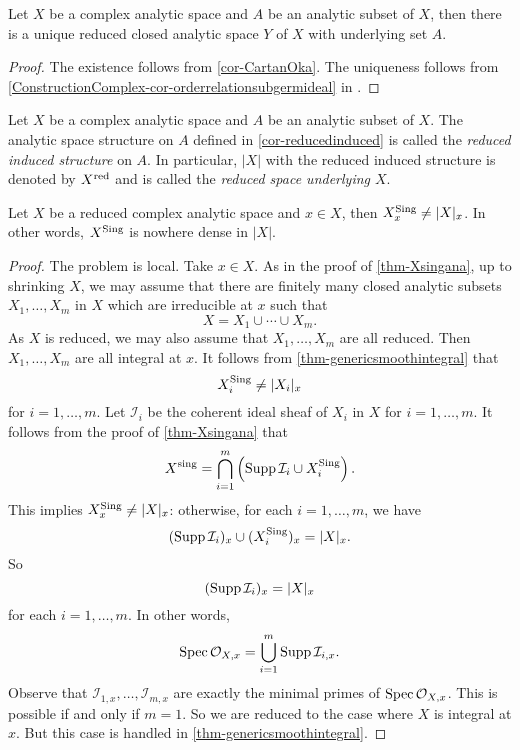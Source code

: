 \begin{corollary}\label{cor-reducedinduced}
    Let $X$ be a complex analytic space and $A$ be an analytic subset of $X$, then there is a unique reduced closed analytic space $Y$ of $X$ with underlying set $A$.
\end{corollary}
\begin{proof}
    The existence follows from \cref{cor-CartanOka}. The uniqueness follows from \cref{ConstructionComplex-cor-orderrelationsubgermideal} in .
\end{proof}

\begin{definition}
    Let $X$ be a complex analytic space and $A$ be an analytic subset of $X$. The analytic space structure on $A$ defined in \cref{cor-reducedinduced} is called the \emph{reduced induced structure} on $A$. In particular, $|X|$ with the reduced induced structure is denoted by $X^{\operatorname{red}}$ and is called the \emph{reduced space underlying $X$}.
\end{definition}

\begin{thm}\label{thm-gensmooth}
    Let $X$ be a reduced complex analytic space and $x\in X$, then $X^{\operatorname{Sing}}_x\neq |X|_x$. In other words, $X^{\operatorname{Sing}}$ is nowhere dense in $|X|$. 
\end{thm}
\begin{proof}
    The problem is local. Take $x\in X$. As in the proof of \cref{thm-Xsingana}, up to shrinking $X$, we may assume that there are finitely many closed analytic subsets $X_1,\ldots,X_m$ in $X$ which are irreducible at $x$ such that 
    \[
        X=X_1\cup\cdots\cup X_m.  
    \]
    As $X$ is reduced, we may also assume that $X_1,\ldots,X_m$ are all reduced. Then $X_1,\ldots,X_m$ are all integral at $x$. It follows from \cref{thm-genericsmoothintegral} that 
    \[
        X_i^{\operatorname{Sing}}\neq |X_i|_x
    \]
    for $i=1,\ldots,m$.
    Let $\mathcal{I}_i$ be the coherent ideal sheaf of $X_i$ in $X$ for $i=1,\ldots,m$. It follows from the proof of \cref{thm-Xsingana} that
    \[
        X^{\operatorname{sing}}=\bigcap_{i=1}^m \left(\operatorname{Supp} \mathcal{I}_i \cup X_i^{\operatorname{Sing}} \right). 
    \]
    This implies $X^{\operatorname{Sing}}_x\neq |X|_x$: otherwise, for each $i=1,\ldots,m$, we have
    \[
        (\operatorname{Supp} \mathcal{I}_i)_x\cup (X_i^{\operatorname{Sing}})_x=|X|_x.  
    \]
    So
    \[
        (\operatorname{Supp} \mathcal{I}_i)_x= |X|_x
    \]
    for each $i=1,\ldots,m$. In other words,
    \[
        \operatorname{Spec} \mathcal{O}_{X,x}=\bigcup_{i=1}^m \operatorname{Supp}\mathcal{I}_{i,x}.
    \]
    Observe that $\mathcal{I}_{1,x},\ldots,\mathcal{I}_{m,x}$ are exactly the minimal primes of $\operatorname{Spec}   \mathcal{O}_{X,x}$. This is possible if and only if $m=1$. So we are reduced to the case where $X$ is integral at $x$. But this case is handled in \cref{thm-genericsmoothintegral}.
\end{proof}



